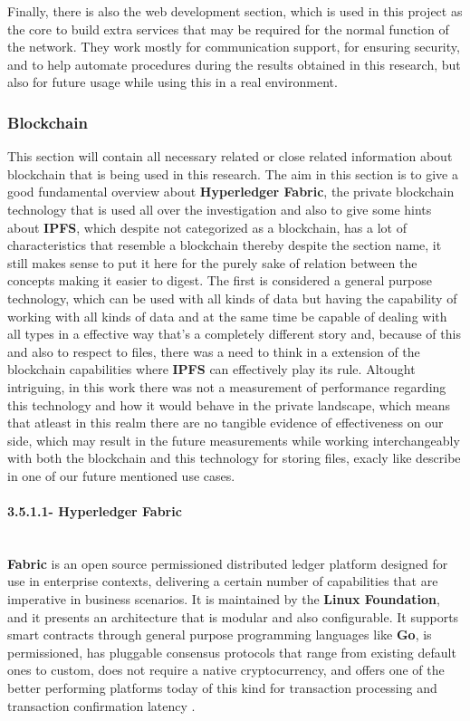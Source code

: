 Finally, there is also the web development section, which is used in this project as the core to build extra services that may be required for the normal function of the network. They work mostly for communication support, for ensuring security, and to help automate procedures during the results obtained in this research, but also for future usage while using this in a real environment.


\subsubsection{Blockchain}
This section will contain all necessary related or close related information about blockchain that is being used in this research. The aim in this section is to give a good fundamental overview about \textbf{Hyperledger Fabric}, the private blockchain technology that is used all over the investigation and also to give some hints about \textbf{IPFS}, which despite not categorized as a blockchain, has a lot of characteristics that resemble a blockchain thereby despite the section name, it still makes sense to put it here for the purely sake of relation between the concepts making it easier to digest. The first is considered a general purpose technology, which can be used with all kinds of data but having the capability of working with all kinds of data and at the same time be capable of dealing with all types in a effective way that's a completely different story and, because of this and also to respect to files, there was a need to think in a extension of the blockchain capabilities where \textbf{IPFS} can effectively play its rule. Altought intriguing, in this work there was not a measurement of performance regarding this technology and how it would behave in the private landscape, which means that atleast in this realm there are no tangible evidence of effectiveness on our side, which may result in the future measurements while working interchangeably with both the blockchain and this technology for storing files, exacly like describe in one of our future mentioned use cases.

\paragraph{3.5.1.1- Hyperledger Fabric}\mbox{}\\
\textbf{Fabric} is an open source permissioned distributed ledger platform designed for use in enterprise contexts, delivering a certain number of capabilities that are imperative in business scenarios. It is maintained by the \textbf{Linux Foundation}, and it presents an architecture that is modular and also configurable. It supports smart contracts through general purpose programming languages like \textbf{Go}, is permissioned, has pluggable consensus protocols that range from existing default ones to custom, does not require a native cryptocurrency, and offers one of the better performing platforms today of this kind for transaction processing and transaction confirmation latency \cite{hyperledger}.

